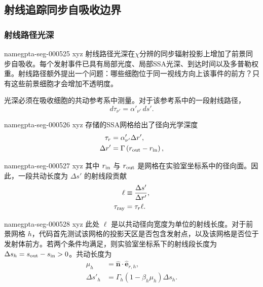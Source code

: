 \documentclass[twocolumn]{aastex702}
\makeatletter
\providecommand{\gptareaderanchor}[1]{\pdfdest name{#1} xyz}%
\providecommand{\gptareaderanchor}[1]{\special{pdf:dest (#1) [ @thispage /XYZ @xpos @ypos null ]}}%
\makeatother
\begin{document}
\subsection{射线追踪同步自吸收边界}

\subsubsection{射线路径光深}


\gptareaderanchor{gpta-seg-000525}%
射线路径光深在\(\chi\)分辨的同步辐射投影上增加了前景同步自吸收。每个发射事件已具有局部光度、局部SSA光深、到达时间以及多普勒权重。射线路径额外提出一个问题：哪些细胞位于同一视线方向上该事件的前方？只有这些前景细胞才会增加不透明度。

光深必须在吸收细胞的共动参考系中测量。对于该参考系中的一段射线路径，
\begin{equation}
d\tau_{\nu'}=\alpha'_{\nu'}\,ds' .
\end{equation}

\gptareaderanchor{gpta-seg-000526}%
存储的SSA网格给出了径向光学深度
\begin{equation}
\begin{aligned}
\tau_r&=\alpha'_{\nu'}\Delta r',\\
\Delta r'&=\Gamma\left(r_{\rm out}-r_{\rm in}\right),
\end{aligned}
\end{equation}

\gptareaderanchor{gpta-seg-000527}%
其中 \(r_{\rm in}\) 与 \(r_{\rm out}\) 是网格在实验室坐标系中的径向面。因此，一段共动长度为 \(\Delta s'\) 的射线段贡献
\begin{equation}
\begin{aligned}
\ell&\equiv\frac{\Delta s'}{\Delta r'},\\
\tau_{\rm ray}&=\tau_r\ell .
\end{aligned}
\end{equation}

\gptareaderanchor{gpta-seg-000528}%
此处 \(\ell\) 是以共动径向宽度为单位的射线长度。对于前景网格 \(h\)，代码首先测试该网格的投影天区是否包含发射点，以及该网格是否位于发射体前方。若两个条件均满足，则实验室坐标系下的射线段长度为 \(\Delta s_h=s_{\rm out}-s_{\rm in}>0\)。共动长度为
\begin{equation}
\begin{aligned}
\mu_h&=\hat{\boldsymbol n}\cdot\hat{\boldsymbol e}_{r,h},\\
\Delta s'_h&=
\Gamma_h\left(1-\beta_h\mu_h\right)\Delta s_h .
\end{aligned}
\end{equation}
\end{document}
